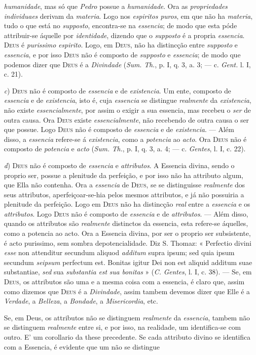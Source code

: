 \emph{humanidade}, mas só que \emph{Pedro} possue a \emph{humanidade}. Ora as \emph{propriedades individuaes} derivam da \emph{materia}. Logo nos \emph{espiritos puros}, em que não ha \emph{materia}, tudo o que está no \emph{supposto}, encontra-se na \emph{essencia}; de modo que esta póde attribuir-se áquelle por \emph{identidade}, dizendo que o \emph{supposto} é a propria \emph{essencia}. \textsc{Deus} é \emph{purissimo espirito}. Logo, em \textsc{Deus}, não ha distincção entre \emph{supposto} e \emph{essencia}, e por isso \textsc{Deus} não é composto de \emph{supposto} e \emph{essencia}; de modo que podemos dizer que \textsc{Deus} é a \emph{Divindade} (\emph{Sum. Th.}, p. I, q. 3, a. 3; --- c. \emph{Gent.} l. I, c. 21).\par \emph{c}) \textsc{Deus} não é composto de \emph{essencia} e de \emph{existencia}. Um ente, composto de \emph{essencia} e de \emph{existencia}, isto é, cuja \emph{essencia} se distingue \emph{realmente} da \emph{existencia}, não existe \emph{essencialmente}, por assim o exigir a sua essencia, mas recebeu o \emph{ser} de outra causa. Ora \textsc{Deus} existe \emph{essencialmente}, não recebendo de outra causa o ser que possue. Logo \textsc{Deus} não é composto de \emph{essencia} e de \emph{existencia}. --- Além disso, a \emph{essencia} refere-se á \emph{existencia}, como a \emph{potencia} ao \emph{acto}. Ora \textsc{Deus} não é composto de \emph{potencia} e \emph{acto} (\emph{Sum. Th.}, p. I, q. 3, a. 4; --- c. \emph{Gentes}, l. I, c. 22).\par \emph{d}) \textsc{Deus} não é composto de \emph{essencia} e \emph{attributos}. A Essencia divina, sendo o proprio ser, possue a plenitude da perfeição, e por isso não ha attributo algum, que Ella não contenha. Ora a \emph{essencia} de \textsc{Deus}, se se distinguisse \emph{realmente} dos seus attributos, aperfeiçoar-se-hia pelos mesmos attributos, e já não possuiria a plenitude da perfeição. Logo em \textsc{Deus} não ha distincção \emph{real} entre a \emph{essencia} e os \emph{attributos}. Logo \textsc{Deus} não é composto de \emph{essencia} e de \emph{attributos}. --- Além disso, quando os attributos são \emph{realmente} distinctos da essencia, esta refere-se áquelles, como a potencia ao acto. Ora a Essencia divina, por ser o proprio ser subsistente, é acto purissimo, sem sombra depotencialidade. Diz S. Thomaz: « Perfectio divini \emph{esse} non attenditur secundum aliquod \emph{additum} supra ipsum; sed quia ipsum secundum \emph{seipsum} perfectum est. Bonitas igitur Dei non est aliquid additum suae substantiae, \emph{sed} sua \emph{substantia est sua bonitas} » (\emph{C. Gentes}, l. I, c. 38). --- Se, em \textsc{Deus}, os attributos são uma e a mesma coisa com a essencia, é claro que, assim como dizemos que \textsc{Deus} é a \emph{Divindade}, assim tambem devemos dizer que Elle é a \emph{Verdade}, a \emph{Belleza}, a \emph{Bondade}, a \emph{Misericordia}, etc.\par Se, em Deus, os attributos não se distinguem \emph{realmente} da \emph{essencia}, tambem não se distinguem \emph{realmente} entre si, e por isso, na realidade, um identifica-se com outro. E' um corollario da these precedente. Se cada attributo divino se identifica com a Essencia, é evidente que um não se distingue 